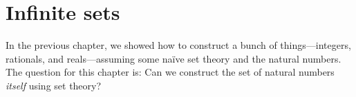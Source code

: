 \documentclass[../../../include/open-logic-chapter]{subfiles}
\begin{document}
\chapter{Infinite sets}\label{ch:Dedekind}

In the previous chapter, we showed how to construct a bunch of things---integers, rationals, and reals---assuming some na\"{i}ve set theory and the natural numbers. The question for this chapter is: Can we construct the set of natural numbers \emph{itself} using set theory?

\end{document}
